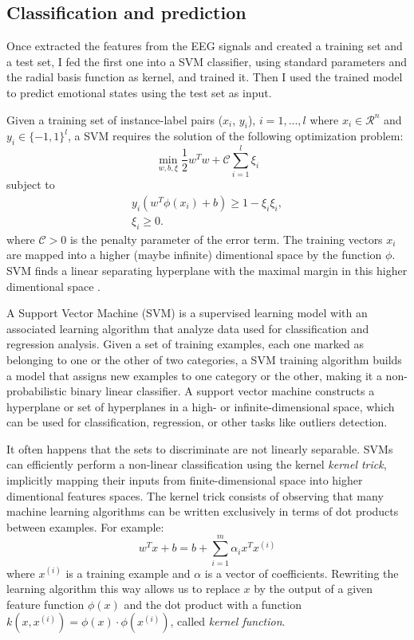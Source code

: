 \documentclass[10pt,journal,A4paper,compsoc,epsfig]{IEEEtran}
\begin{document}
\subsection{Classification and prediction}

Once extracted the features from the EEG signals and created a training set and a test set, I fed the first one into a SVM classifier, using standard parameters and the radial basis function as kernel, and trained it. Then I used the trained model to predict emotional states using the test set as input.

Given a training set of instance-label pairs ($x_i$, $y_i$), $i= 1, ..., l$ where $x_i \in \mathcal{R}^n$ and  $y_i \in \{-1, 1\}^l$, a SVM requires the solution of the following optimization problem:
\begin{equation}
\min_{w,b,\xi}{\frac{1}{2}w^Tw + \mathcal{C}\sum_{i=1}^l{\xi_i}}
\end{equation}
subject to
\begin{eqnarray}
y_i(w^T\phi(x_i)+b)\geq 1-\xi_i\xi_i, \\
\xi_i \geq 0.
\end{eqnarray}
where $\mathcal{C} > 0$ is the penalty parameter of the error term. The training vectors $x_i$ are mapped into a higher (maybe infinite) dimentional space by the function $\phi$. SVM finds a linear separating hyperplane with the maximal margin in this higher dimentional space \cite{hsu2003practical}.

A Support Vector Machine (SVM) is a supervised learning model with an associated learning algorithm that analyze data used for classification and regression analysis. Given a set of training examples, each one marked as belonging to one or the other of two categories, a SVM training algorithm builds a model that assigns new examples to one category or the other, making it a non-probabilistic binary linear classifier.
A support vector machine constructs a hyperplane or set of hyperplanes	 in a high- or infinite-dimensional space, which can be used for classification, regression, or other tasks like outliers detection.

It often happens that the sets to discriminate are not linearly separable. SVMs can efficiently perform a non-linear classification using the kernel \textit{kernel trick}, implicitly mapping their inputs from finite-dimensional space into higher dimentional features spaces. The kernel trick consists of observing that many machine learning algorithms can be written exclusively in terms of dot products between examples. For example:
\begin{equation}
w^Tx + b = b + \sum_{i=1}^m {\alpha_ix^Tx^{(i)}}
\end{equation}
where $x^{(i)}$ is a training example and $\alpha$ is a vector of coefficients. Rewriting the learning algorithm this way allows us to replace $x$ by the output of a given feature function $\phi(x)$ and the dot product with a function $k(x, x^{(i)}) = \phi(x)\cdot\phi(x^{(i)})$, called \textit{kernel function}.
\end{document}

